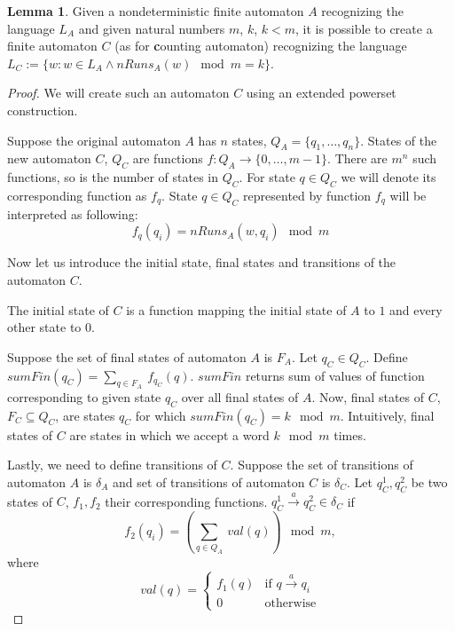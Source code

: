 \documentclass[12pt]{article}
\theoremstyle{definition}
\newtheorem{lemma}[theorem]{Lemma}
\begin{document}
\begin{lemma}
    \label{CountRunsAutomaton}
    Given a nondeterministic finite automaton $A$ recognizing the language $L_A$ and given natural numbers $m$, $k$, $k < m$, it is possible to create a finite automaton $C$ (as for \textbf{c}ounting automaton) recognizing the language $L_{C} := \{ w : w \in L_A \land nRuns_A(w) \mod m = k \}$.
\end{lemma}

\begin{proof}
    We will create such an automaton $C$ using an extended powerset construction.

    Suppose the original automaton $A$ has $n$ states, $Q_A = \{q_1, \ldots, q_n\}$. States of the new automaton $C$, $Q_C$ are functions $f: Q_A \rightarrow \{0, \ldots, m-1 \}$. There are $m^n$ such functions, so is the number of states in $Q_C$. For state $q \in Q_C$ we will denote its corresponding function as $f_q$. State $q \in Q_C$ represented by function $f_q$ will be interpreted as following:
    $$f_q(q_i) = nRuns_A(w, q_i) \mod m$$

    Now let us introduce the initial state, final states and transitions of the automaton $C$.

    The initial state of $C$ is a function mapping the initial state of $A$ to $1$ and every other state to $0$.

    Suppose the set of final states of automaton $A$ is $F_A$. Let $q_C \in Q_C$. Define $sumFin(q_C) = \sum_{q \in F_A} \ f_{q_C}(q)$. $sumFin$ returns sum of values of function corresponding to given state $q_C$ over all final states of $A$. Now, final states of $C$, $F_C \subseteq Q_C$, are states $q_C$ for which $sumFin(q_C) = k \mod m$. Intuitively, final states of $C$ are states in which we accept a word $k \mod m$ times.

    Lastly, we need to define transitions of $C$. Suppose the set of transitions of automaton $A$ is $\delta_A$ and set of transitions of automaton $C$ is $\delta_C$. Let $q_C^1, q_C^2$ be two states of $C$, $f_1, f_2$ their corresponding functions.  $q_C^1 \xrightarrow{a} q_C^2 \in \delta_C$ if 
    $$f_2(q_i) = (\sum_{q \in Q_A} \ val(q)) \mod m,$$
    where
    \begin{equation*}
        val(q) =
            \begin{cases}
            f_1(q) & \text{if $q \xrightarrow{a} q_i$} \\
            0 & \text{otherwise}
            \end{cases}       
    \end{equation*}


\end{proof}
\end{document}
